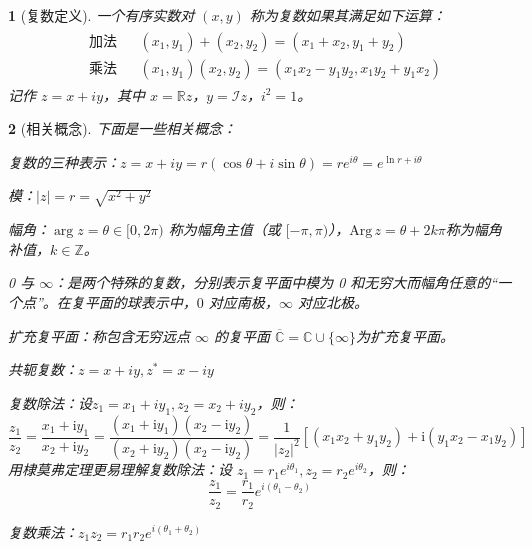 \documentclass[UTF8]{report}
\def\Arg{\mathrm{Arg}\,}
\def\Z{\mathbb{Z}}
\def\R{\mathbb{R}}
\def\C{\mathbb{C}}
\def\I{\mathscr{I}}
\theoremstyle{MyLineTheoremStyle} %
\theoremstyle{MyBlockTheoremStyle} %
\theoremstyle{MySubsubsectionStyle} %
\newtheorem{definition}{}
\begin{document}
\begin{definition}[复数定义]
    一个有序实数对 $(x,y)$ 称为复数如果其满足如下运算：
\begin{gather}
    \begin{aligned}
        &\text{加法}&&(x_1,y_1)+(x_2,y_2)=(x_1+x_2,y_1+y_2)\\
        &\text{乘法}&&(x_1,y_1)(x_2,y_2)=(x_1x_2-y_1y_2,x_1y_2+y_1x_2)
    \end{aligned}
\end{gather}
记作 $z = x + iy$，其中 $x = \R z$，$y = \I z$，$i^2 = 1$。

\end{definition}


\begin{definition}[相关概念] 
    下面是一些相关概念：
\begin{circledenum}
    \item 复数的三种表示：$z = x + iy = r(\cos \theta + i\sin \theta) =  re^{i\theta} = e^{\ln r + i\theta}$
    \item 模：$|z| = r =\sqrt{x^2+y^2}$
    \item 幅角：$\arg z = \theta \in [0, 2\pi)$ 称为幅角主值（或 $[-\pi, \pi)$），$\Arg z = \theta + 2k\pi$称为幅角补值，$k\in\Z$。
    \item 0 与 $\infty$：是两个特殊的复数，分别表示复平面中模为 0 和无穷大而幅角任意的“一个点”。在复平面的球表示中，$0$ 对应南极，$\infty$ 对应北极。
    \item 扩充复平面：称包含无穷远点 $\infty$ 的复平面 $\overline{\C} = \C \cup \{\infty\}$为扩充复平面。
    \item 共轭复数：$ z = x + iy, z^* = x - iy$
    \item 复数除法：设$z_1 = x_1 + iy_1, z_2 = x_2 + iy_2$，则：
    \begin{equation}
    \frac{z_1}{z_2}= \frac{x_1+\mathrm{i}y_1}{x_2+\mathrm{i}y_2}=\frac{(x_1+\mathrm{i}y_1)(x_2-\mathrm{i}y_2)}{(x_2+\mathrm{i}y_2)(x_2-\mathrm{i}y_2)} = \frac{1}{| z_2 |^2}\left[ (x_1x_2+y_1y_2) + \mathrm{i}(y_1x_2-x_1y_2) \right]
    \end{equation}
    用棣莫弗定理更易理解复数除法：设 $z_1 = r_1e^{i\theta_1}, z_2 = r_2e^{i\theta_2}$，则： 
    \begin{equation}
    \frac{z_1}{z_2} = \frac{r_1}{r_2}e^{i(\theta_1-\theta_2)}
    \end{equation}
    \item 复数乘法：$z_1z_2 = r_1r_2e^{i(\theta_1+\theta_2)}$
\end{circledenum}



\end{definition}
\end{document}
